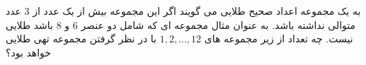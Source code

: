 \exercise
به یک مجموعه اعداد صحیح طلایی می گویند اگر این مجموعه بیش از یک عدد از
$3$
عدد متوالی نداشته باشد. به عنوان مثال مجموعه ای که شامل دو عنصر
$6$
و
$8$
باشد طلایی نیست. چه تعداد از زیر مجموعه های
${1, 2, ..., 12}$
با در نظر گرفتن مجموعه تهی طلایی خواهد بود؟